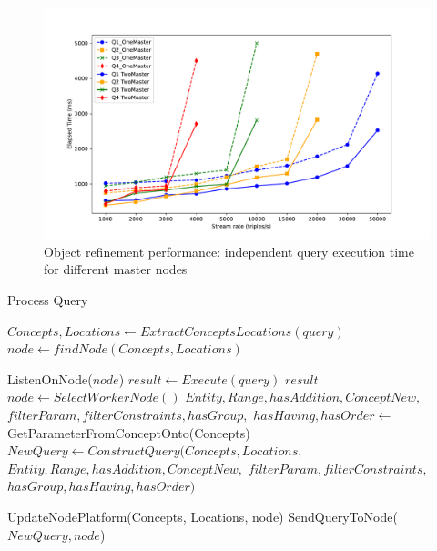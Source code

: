 \documentclass[5p,times]{elsarticle}
\begin{document}
\begin{figure}[t]
  \centering
  \includegraphics[width=\columnwidth]{result_TwoMaster_OneMaster.pdf}
  \caption{Object refinement performance: independent query execution time for different master nodes}
  \label{fig:resultTwoMasterOneMaster}
\end{figure}

\begin{algorithm}[t]
  \caption{Process Query}\label{alg:conceptQuery}
  \begin{algorithmic}[1]
  
        \State $Concepts, Locations \gets ExtractConceptsLocations(query)$
        \State $node \gets findNode(Concepts, Locations)$
  
            \State ListenOnNode($node$)
            \State $result \gets Execute(query)$
            \State \Return $result$
        \Else
            \State $node \gets SelectWorkerNode()$
            \State $Entity, Range, hasAddition, ConceptNew,$
            \Statex \hspace{1em} $filterParam, filterConstraints, hasGroup,$
            \Statex \hspace{1em} $hasHaving, hasOrder \gets$
            \Statex \hspace{1em} GetParameterFromConceptOnto(Concepts)
            \State $NewQuery \gets ConstructQuery(Concepts, Locations,$
            \Statex \hspace{1em} $Entity, Range, hasAddition, ConceptNew,$
            \Statex \hspace{1em} $filterParam, filterConstraints,$
            \Statex \hspace{1em} $hasGroup, hasHaving, hasOrder)$
  
            \State UpdateNodePlatform(Concepts, Locations, node)
            \State SendQueryToNode($NewQuery, node$)
        \EndIf
    \EndWhile
  \EndProcedure
  
  \end{algorithmic}
\end{algorithm}
\end{document}
